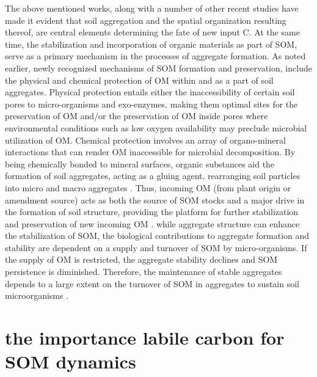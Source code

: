 \documentclass[12pt]{report}
\begin{document}
	The above mentioned works, along with a  number of other recent studies have made it evident that soil aggregation and the spatial organization resulting thereof, are central elements determining the fate of new input C. At the same time, the stabilization and incorporation of organic materials as part of SOM, serve as a primary mechanism in the processes of aggregate formation. As noted earlier, newly recognized mechanisms of SOM formation and preservation, include the physical and chemical protection of OM within and as a part of soil aggregates. Physical protection entails either the inaccessibility of certain soil pores to micro-organisms and exo-enzymes, making them optimal sites for the preservation of OM and/or the preservation of OM inside pores where environmental conditions such as low oxygen availability may preclude microbial utilization of OM. Chemical protection involves an array of organo-mineral interactions that can render OM inaccessible for microbial decomposition. By being chemically bonded to mineral surfaces, organic substances aid the formation of soil aggregates, acting as a gluing agent, rearranging soil particles into micro and macro aggregates \citep{six2002}. Thus, incoming OM (from plant origin or amendment source) acts as both the source of SOM stocks and a major drive in the formation of soil structure, providing the platform for further stabilization and preservation of new incoming OM \citep{mccarthy2008}.
	while aggregate structure can enhance the stabilization of SOM, the biological contributions to aggregate formation and stability are dependent on a supply and turnover of SOM by micro-organisms. If the supply of OM is restricted, the aggregate stability declines and SOM persistence is diminished. Therefore, the maintenance of stable aggregates  depends to a large extent on the turnover of SOM in aggregates to sustain soil microorganisms \citep{dungait2012, golchin1994}.


\section{the importance labile carbon for SOM dynamics}	
	
\end{document}
